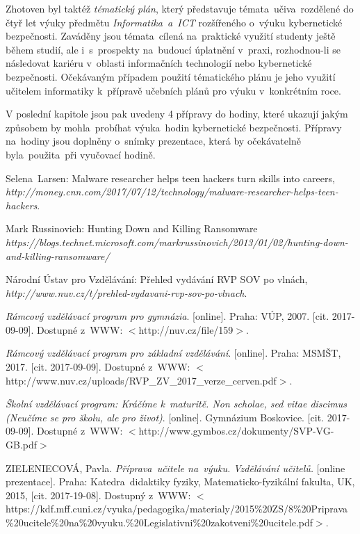 \documentclass[a4paper, 12pt]{article}
\begin{document}
Zhotoven byl taktéž \textit{tématický plán}, který představuje témata~učiva~rozdělené do čtyř let výuky předmětu \textit{Informatika~a~ICT} rozšířeného o~výuku kybernetické bezpečnosti. Zaváděny jsou témata~cílená na~praktické využití studenty ještě během studií, ale i~s~prospekty na~budoucí úplatnění v~praxi, rozhodnou-li se následovat kariéru v~oblasti informačních technologií nebo kybernetické bezpečnosti. Očekávaným případem použití tématického plánu je jeho využití učitelem informatiky k~přípravě učebních plánů pro výuku v~konkrétním roce.

V poslední kapitole jsou pak uvedeny 4 přípravy do hodiny, které ukazují jakým způsobem by mohla~probíhat výuka~hodin kybernetické bezpečnosti. Přípravy na~hodiny jsou doplněny o~snímky prezentace, která by očekávatelně byla~použita~při vyučovací hodině.

\newpage
\begin{thebibliography}{9}

    Selena~Larsen: Malware researcher helps teen hackers turn skills into careers,
    \\\textit{http://money.cnn.com/2017/07/12/technology/malware-researcher-helps-teen-hackers}.

    Mark Russinovich: Hunting Down and Killing Ransomware
    \\\textit{https://blogs.technet.microsoft.com/markrussinovich/2013/01/02/hunting-down-and-killing-ransomware/}

    Národní Ústav pro Vzdělávání: Přehled vydávání RVP SOV po vlnách,
    \\\textit{http://www.nuv.cz/t/prehled-vydavani-rvp-sov-po-vlnach}.

    \textit{Rámcový vzdělávací program pro gymnázia}. [online]. Praha: VÚP, 2007. [cit. 2017-09-09]. Dostupné z~WWW: $<$http://nuv.cz/file/159$>$.

    \textit{Rámcový vzdělávací program pro základní vzdělávání}. [online]. Praha: MSMŠT, 2017. [cit. 2017-09-09]. Dostupné z~WWW: $<$http://www.nuv.cz/uploads/RVP\_ZV\_2017\_verze\_cerven.pdf$>$.

    \textit{Školní vzdělávací program: Kráčíme k~maturitě. Non scholae, sed vitae discimus (Neučíme se pro školu, ale pro život)}. [online]. Gymnázium Boskovice. [cit. 2017-09-09]. Dostupné z~WWW: $<$http://www.gymbos.cz/dokumenty/SVP-VG-GB.pdf$>$

    ZIELENIECOVÁ, Pavla. \textit{Příprava~učitele na~výuku. Vzdělávání učitelů.} [online prezentace]. Praha: Katedra~didaktiky fyziky, Matematicko-fyzikální fakulta, UK, 2015, [cit. 2017-19-08]. Dostupný z~WWW: $<$https://kdf.mff.cuni.cz/vyuka/pedagogika/materialy/2015\%20ZS/8\%20Priprava\\\%20ucitele\%20na\%20vyuku.\%20Legislativni\%20zakotveni\%20ucitele.pdf$>$.

\end{thebibliography}
\end{document}
